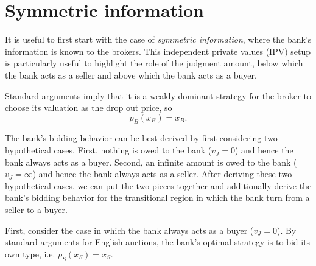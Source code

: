 \documentclass[11pt,twopage]{article}
\newtheorem{remark}{Remark}
{\bf}{\it}
\begin{document}
\section{Symmetric information}
\label{sec:indep-priv-valu}

It is useful to first start with the case of \emph{symmetric
  information}, where the bank's information is known to the brokers.
This independent private values (IPV) setup is particularly useful to
highlight the role of the judgment amount, below which the bank acts
as a seller and above which the bank acts as a buyer.

Standard arguments imply that it is a weakly dominant strategy for the
broker to choose its valuation as the drop out price, so
\[p_B(x_B) = x_B.
\]

The bank's bidding behavior can be best derived by first considering
two hypothetical cases. First, nothing is owed to the bank ($v_J=0$)
and hence the bank always acts as a buyer. Second, an infinite amount
is owed to the bank ($v_J=\infty$) and hence the bank always acts as a
seller. After deriving these two hypothetical cases, we can put the
two pieces together and additionally derive the bank's bidding
behavior for the transitional region in which the bank turn from a
seller to a buyer.

First, consider the case in which the bank always acts as a buyer
($v_J=0$). By standard arguments for English auctions, the bank's
optimal strategy is to bid its own type, i.e. $p_S(x_S)=x_S$.
\end{document}
